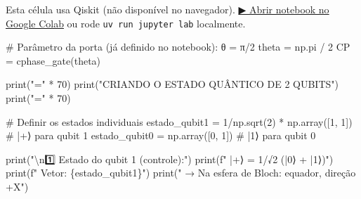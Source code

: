 \documentclass[
  brazilian,
]{report}
\newenvironment{Shaded}{\begin{snugshade}}{\end{snugshade}}
\newcommand{\BuiltInTok}[1]{\textcolor[rgb]{0.00,0.23,0.31}{#1}}
\newcommand{\CharTok}[1]{\textcolor[rgb]{0.13,0.47,0.30}{#1}}
\newcommand{\CommentTok}[1]{\textcolor[rgb]{0.37,0.37,0.37}{#1}}
\newcommand{\DecValTok}[1]{\textcolor[rgb]{0.68,0.00,0.00}{#1}}
\newcommand{\NormalTok}[1]{\textcolor[rgb]{0.00,0.23,0.31}{#1}}
\newcommand{\OperatorTok}[1]{\textcolor[rgb]{0.37,0.37,0.37}{#1}}
\newcommand{\SpecialCharTok}[1]{\textcolor[rgb]{0.37,0.37,0.37}{#1}}
\newcommand{\SpecialStringTok}[1]{\textcolor[rgb]{0.13,0.47,0.30}{#1}}
\newcommand{\StringTok}[1]{\textcolor[rgb]{0.13,0.47,0.30}{#1}}
\begin{document}
\begin{tcolorbox}[enhanced jigsaw, arc=.35mm, bottomrule=.15mm, bottomtitle=1mm, breakable, colback=white, colbacktitle=quarto-callout-warning-color!10!white, colframe=quarto-callout-warning-color-frame, coltitle=black, left=2mm, leftrule=.75mm, opacityback=0, opacitybacktitle=0.6, rightrule=.15mm, title=\textcolor{quarto-callout-warning-color}{\faExclamationTriangle}\hspace{0.5em}{⚛️ Célula Qiskit --- execute no Colab ou localmente}, titlerule=0mm, toprule=.15mm, toptitle=1mm]

Esta célula usa Qiskit (não disponível no navegador).
\href{https://colab.research.google.com/github/maxwellamaral/aula-quantum/blob/main/notebooks/00b-phases.ipynb}{▶
Abrir notebook no Google Colab} ou rode \texttt{uv\ run\ jupyter\ lab}
localmente.

\begin{Shaded}
\begin{Highlighting}[]


\CommentTok{\# Parâmetro da porta (já definido no notebook): θ = π/2}
\NormalTok{theta }\OperatorTok{=}\NormalTok{ np.pi }\OperatorTok{/} \DecValTok{2}
\NormalTok{CP }\OperatorTok{=}\NormalTok{ cphase\_gate(theta)}

\BuiltInTok{print}\NormalTok{(}\StringTok{"="} \OperatorTok{*} \DecValTok{70}\NormalTok{)}
\BuiltInTok{print}\NormalTok{(}\StringTok{"CRIANDO O ESTADO QUÂNTICO DE 2 QUBITS"}\NormalTok{)}
\BuiltInTok{print}\NormalTok{(}\StringTok{"="} \OperatorTok{*} \DecValTok{70}\NormalTok{)}

\CommentTok{\# Definir os estados individuais}
\NormalTok{estado\_qubit1 }\OperatorTok{=} \DecValTok{1}\OperatorTok{/}\NormalTok{np.sqrt(}\DecValTok{2}\NormalTok{) }\OperatorTok{*}\NormalTok{ np.array([}\DecValTok{1}\NormalTok{, }\DecValTok{1}\NormalTok{])   }\CommentTok{\# |+⟩ para qubit 1}
\NormalTok{estado\_qubit0 }\OperatorTok{=}\NormalTok{ np.array([}\DecValTok{0}\NormalTok{, }\DecValTok{1}\NormalTok{])                  }\CommentTok{\# |1⟩ para qubit 0}

\BuiltInTok{print}\NormalTok{(}\StringTok{"}\CharTok{\textbackslash{}n}\StringTok{1️⃣ Estado do qubit 1 (controle):"}\NormalTok{)}
\BuiltInTok{print}\NormalTok{(}\SpecialStringTok{f"   |+⟩ = 1/√2 (|0⟩ + |1⟩)"}\NormalTok{)}
\BuiltInTok{print}\NormalTok{(}\SpecialStringTok{f"   Vetor: }\SpecialCharTok{\{}\NormalTok{estado\_qubit1}\SpecialCharTok{\}}\SpecialStringTok{"}\NormalTok{)}
\BuiltInTok{print}\NormalTok{(}\StringTok{"   → Na esfera de Bloch: equador, direção +X"}\NormalTok{)}


\end{Highlighting}
\end{Shaded}
\end{tcolorbox}
\end{document}
